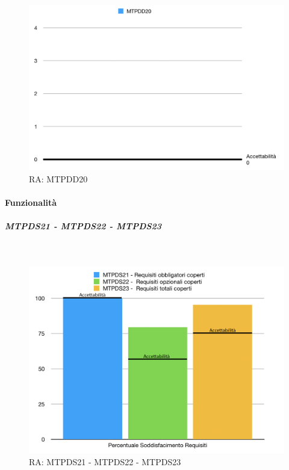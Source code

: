 \begin{figure}[H]
	\begin{center}
		\includegraphics[scale=0.5]{./images/grafici_RA/MTPDD20.png} 
		\caption{RA: MTPDD20}
	\end{center}
\end{figure}

\pagebreak

\paragraph{Funzionalità}

\subparagraph{MTPDS21 - MTPDS22 - MTPDS23} \-\\

\begin{figure}[H]
	\begin{center}
		\includegraphics[scale=0.5]{./images/grafici_RA/Funzionalita.png} 
		\caption{RA: MTPDS21 - MTPDS22 - MTPDS23}
	\end{center}
\end{figure}

